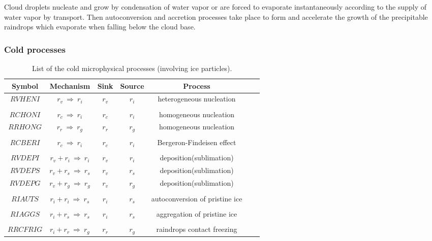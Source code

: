 Cloud droplets nucleate and grow by condensation of water vapor or are forced to
evaporate instantaneously according to the supply of water vapor by transport.
Then autoconversion and accretion processes take place to form and accelerate
the growth of the precipitable raindrops which evaporate when falling below the
cloud base.

%
\newpage
\subsubsection{Cold processes}
%

%
\begin{table}[!ht]
\caption{List of the cold microphysical processes (involving ice particles).}
\label{table4}
\begin{center}
\begin{tabular}{|c|c|c|c|c|c|c|}
\hline
Symbol & Mechanism & Sink & Source & Process \\
\hline \hline
$RVHENI$ & $r_v\ \Longrightarrow \ r_i$ & $r_v$ & $r_i$ & heterogeneous nucleation\\
 & & & & \\
$RCHONI$ & $r_c\ \Longrightarrow \ r_i$ & $r_c$ & $r_i$ & homogeneous nucleation\\
$RRHONG$ & $r_r\ \Longrightarrow \ r_g$ & $r_r$ & $r_g$ & homogeneous nucleation\\
 & & & & \\
$RCBERI$ & $r_c\ \Longrightarrow \ r_i$ & $r_c$ & $r_i$ & Bergeron-Findeisen effect \\
 & & & & \\
$RVDEPI$ & $r_v+r_i\ \Longrightarrow \ r_i$ & $r_v$ & $r_i$ & deposition(sublimation) \\
$RVDEPS$ & $r_v+r_s\ \Longrightarrow \ r_s$ & $r_v$ & $r_s$ & deposition(sublimation) \\
$RVDEPG$ & $r_v+r_g\ \Longrightarrow \ r_g$ & $r_v$ & $r_g$ & deposition(sublimation) \\
 & & & & \\
$RIAUTS$ & $r_i+r_i\ \Longrightarrow \ r_s$ & $r_i$ & $r_s$ & autoconversion of pristine ice \\
 & & & & \\
$RIAGGS$ & $r_i+r_s\ \Longrightarrow \ r_s$ & $r_i$ & $r_s$ & aggregation of pristine ice \\
 & & & & \\
$RRCFRIG$ & $r_i+r_r\ \Longrightarrow \ r_g$ & $r_r$ & $r_g$ & raindrops contact freezing \\

\end{tabular}
\end{center}
\end{table}
